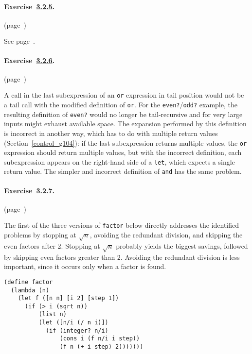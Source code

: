 \paragraph{Exercise \hyperref[further_g60]{3.2.5}. }(page \pageref{further_s57})

  See page \pageref{syntax_defn_let}. 


\paragraph{Exercise \hyperref[further_g61]{3.2.6}. }(page \pageref{further_s58})

  A call in the last subexpression of an \texttt{or} expression in tail position would not be a tail call with the modified definition of \texttt{or}. For the \texttt{even?}/\texttt{odd?} example, the resulting definition of \texttt{even?} would no longer be tail-recursive and for very large inputs might exhaust available space. 
The expansion performed by this definition is incorrect in another way, which has to do with multiple return values (Section \ref{control_g104}): if the last subexpression returns multiple values, the \texttt{or} expression should return multiple values, but with the incorrect definition, each subexpression appears on the right-hand side of a \texttt{let}, which expects a single return value. The simpler and incorrect definition of \texttt{and} has the same problem. 


\paragraph{Exercise \hyperref[further_g62]{3.2.7}. }(page \pageref{further_s59})

  The first of the three versions of \texttt{factor} below directly addresses the identified problems by stopping at \(\sqrt{n}\), avoiding the redundant division, and skipping the even factors after 2. Stopping at \(\sqrt{n}\) probably yields the biggest savings, followed by skipping even factors greater than 2. Avoiding the redundant division is less important, since it occurs only when a factor is found. 
\begin{alltt}
(define factor
   (lambda (n)
     (let f ([n n] [i 2] [step 1])
       (if (\textgreater{} i (sqrt n))
           (list n)
           (let ([n/i (/ n i)])
             (if (integer? n/i)
                 (cons i (f n/i i step))
                 (f n (+ i step) 2)))))))
\end{alltt}

